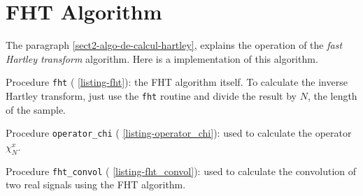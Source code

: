 \section{FHT Algorithm}
\label{sect1-listing-fht}
 
  The paragraph \ref{sect2-algo-de-calcul-hartley}, explains the operation of the \textit{fast Hartley transform} algorithm. Here is a \Matlab{} implementation of this algorithm. \begin{rs}
\item Procedure \texttt{fht} (\listingterme{} \ref{listing-fht}): the FHT algorithm itself. To calculate the inverse Hartley transform, just use the \texttt{fht} routine and divide the result by $ N $, the length of the sample.
\item Procedure \texttt{operator\_chi} (\listingterme{} \ref{listing-operator_chi}): used to calculate the operator $ \chi_N^x $.
\item Procedure \texttt{fht\_convol} (\listingterme{} \ref{listing-fht_convol}): used to calculate the convolution of two real signals using the FHT algorithm.
\end{rs}
